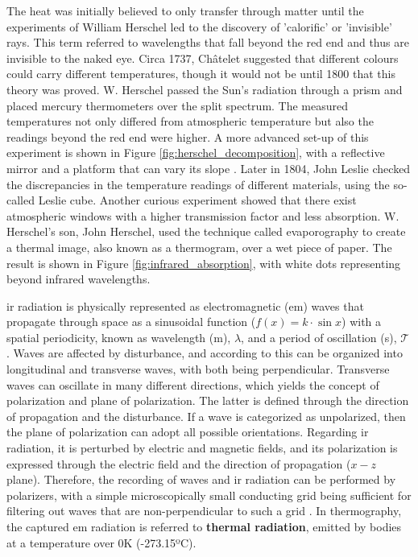 \begin{kaobox}[frametitle=Discovery of infrared radiation]
The heat was initially believed to only transfer through matter until the experiments of William Herschel led to the discovery of 'calorific' or 'invisible' rays. This term referred to wavelengths that fall beyond the red end and thus are invisible to the naked eye. Circa 1737, Châtelet suggested that different colours could carry different temperatures, though it would not be until 1800 that this theory was proved. W. Herschel passed the Sun's radiation through a prism and placed mercury thermometers over the split spectrum. The measured temperatures not only differed from atmospheric temperature but also the readings beyond the red end were higher. A more advanced set-up of this experiment is shown in Figure \ref{fig:herschel_decomposition}, with a reflective mirror and a platform that can vary its slope \cite{ring_discovery_2000, minkina_how_2021, minkina_infrared_2009}. Later in 1804, John Leslie checked the discrepancies in the temperature readings of different materials, using the so-called Leslie cube. Another curious experiment showed that there exist atmospheric windows with a higher transmission factor and less absorption. W. Herschel's son, John Herschel, used the technique called evaporography to create a thermal image, also known as a thermogram, over a wet piece of paper. The result is shown in Figure \ref{fig:infrared_absorption}, with white dots representing beyond infrared wavelengths. 
\end{kaobox}

\acrshort{ir} radiation is physically represented as electromagnetic (\acrshort{em}) waves that propagate through space as a sinusoidal function ($f(x) = k \cdot \sin{x}$) with a spatial periodicity, known as wavelength (\si{\meter}), $\lambda$, and a period of oscillation (\si{\second}), $\mathcal{T}$. 
Waves are affected by disturbance, and according to this can be organized into longitudinal and transverse waves, with both being perpendicular. Transverse waves can oscillate in many different directions, which yields the concept of polarization and plane of polarization. The latter is defined through the direction of propagation and the disturbance. If a wave is categorized as unpolarized, then the plane of polarization can adopt all possible orientations. Regarding \acrshort{ir} radiation, it is perturbed by electric and magnetic fields, and its polarization is expressed through the electric field and the direction of propagation ($x-z$ plane). Therefore, the recording of waves and \acrshort{ir} radiation can be performed by polarizers, with a simple microscopically small conducting grid being sufficient for filtering out waves that are non-perpendicular to such a grid \cite{vollmer_infrared_2017}. In thermography, the captured \acrshort{em} radiation is referred to \textbf{thermal radiation}, emitted by bodies at a temperature over 0\si{\kelvin} (-273.15ºC). 

